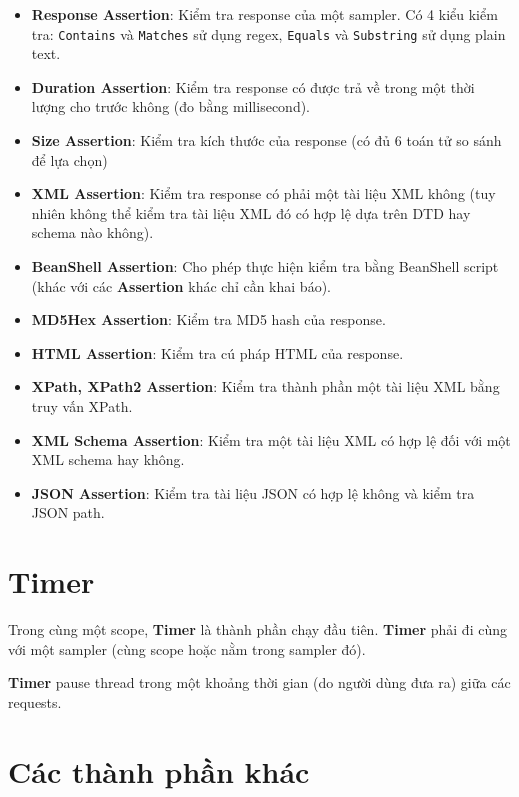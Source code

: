 \documentclass[10pt]{report}
\begin{document}
\begin{itemize}
    \item \textbf{Response Assertion}: Kiểm tra response của một sampler. Có 4 kiểu kiểm tra: \texttt{Contains} và \texttt{Matches} sử dụng regex, \texttt{Equals} và \texttt{Substring} sử dụng plain text.
    \item \textbf{Duration Assertion}: Kiểm tra response có được trả về trong một thời lượng cho trước không (đo bằng millisecond).
    \item \textbf{Size Assertion}: Kiểm tra kích thước của response (có đủ 6 toán tử so sánh để lựa chọn)
    \item \textbf{XML Assertion}: Kiểm tra response có phải một tài liệu XML không (tuy nhiên không thể kiểm tra tài liệu XML đó có hợp lệ dựa trên DTD hay schema nào không).
    \item \textbf{BeanShell Assertion}: Cho phép thực hiện kiểm tra bằng BeanShell script (khác với các \textbf{Assertion} khác chỉ cần khai báo).
    \item \textbf{MD5Hex Assertion}: Kiểm tra MD5 hash của response.
    \item \textbf{HTML Assertion}: Kiểm tra cú pháp HTML của response.
    \item \textbf{XPath, XPath2 Assertion}: Kiểm tra thành phần một tài liệu XML bằng truy vấn XPath.
    \item \textbf{XML Schema Assertion}: Kiểm tra một tài liệu XML có hợp lệ đối với một XML schema hay không.
    \item \textbf{JSON Assertion}: Kiểm tra tài liệu JSON có hợp lệ không và kiểm tra JSON path.
\end{itemize}

\section{Timer}

\par Trong cùng một scope, \textbf{Timer} là thành phần chạy đầu tiên. \textbf{Timer} phải đi cùng với một sampler (cùng scope hoặc nằm trong sampler đó).

\par \textbf{Timer} pause thread trong một khoảng thời gian (do người dùng đưa ra) giữa các requests.

\section{Các thành phần khác}
\end{document}

